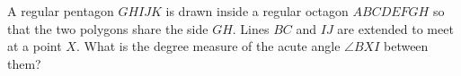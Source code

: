 A regular pentagon $GHIJK$ is drawn inside a regular octagon $ABCDEFGH$ so that the two polygons share the side $GH$. Lines $BC$ and $IJ$ are extended to meet at a point $X$. What is the degree measure of the acute angle $\angle BXI$ between them?
